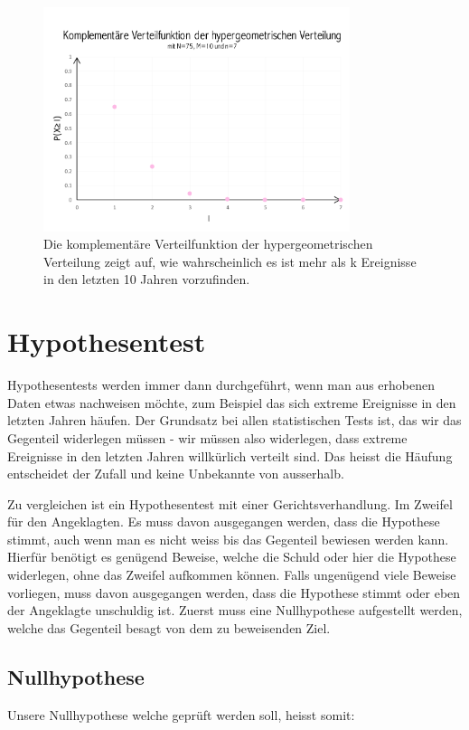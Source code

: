 \begin{refsection}
\begin{figure}[htbp]
\centering
\includegraphics[width=0.8\textwidth]{extrem/HyperExt.pdf}
\caption{Die komplementäre Verteilfunktion der hypergeometrischen Verteilung zeigt auf, wie wahrscheinlich es ist mehr als k Ereignisse in den letzten 10 Jahren vorzufinden.}
\label{HyperExt}
\end{figure}


\section{Hypothesentest}
Hypothesentests werden immer dann durchgeführt, wenn man aus erhobenen Daten etwas nachweisen möchte, zum Beispiel das sich extreme Ereignisse in den letzten Jahren häufen. Der Grundsatz bei allen statistischen Tests ist, das wir das Gegenteil widerlegen müssen - wir müssen also widerlegen, dass extreme Ereignisse in den letzten Jahren willkürlich verteilt sind. Das heisst die Häufung entscheidet der Zufall und keine Unbekannte von ausserhalb.

Zu vergleichen ist ein Hypothesentest mit einer Gerichtsverhandlung. Im Zweifel für den Angeklagten. Es muss davon ausgegangen werden, dass die Hypothese stimmt, auch wenn man es nicht weiss bis das Gegenteil bewiesen werden kann. Hierfür benötigt es genügend Beweise, welche die Schuld oder hier die Hypothese widerlegen, ohne das Zweifel aufkommen können. Falls ungenügend viele Beweise vorliegen, muss davon ausgegangen werden, dass die Hypothese stimmt oder eben der Angeklagte unschuldig ist.
Zuerst muss eine Nullhypothese aufgestellt werden, welche das Gegenteil besagt von dem zu beweisenden Ziel.

\subsection{Nullhypothese}
Unsere Nullhypothese welche geprüft werden soll, heisst somit:


\end{refsection}
